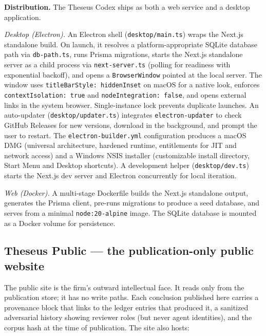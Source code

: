 \documentclass[11pt,letterpaper]{article}
\newcommand{\file}[1]{\texttt{#1}}
\begin{document}
\textbf{Distribution.} The Theseus Codex ships as both a web service and a desktop application.

\emph{Desktop (Electron).} An Electron shell (\file{desktop/main.ts}) wraps the Next.js standalone build. On launch, it resolves a platform-appropriate SQLite database path via \file{db-path.ts}, runs Prisma migrations, starts the Next.js standalone server as a child process via \file{next-server.ts} (polling for readiness with exponential backoff), and opens a \texttt{BrowserWindow} pointed at the local server. The window uses \texttt{titleBarStyle: hiddenInset} on macOS for a native look, enforces \texttt{contextIsolation: true} and \texttt{nodeIntegration: false}, and opens external links in the system browser. Single-instance lock prevents duplicate launches. An auto-updater (\file{desktop/updater.ts}) integrates \texttt{electron-updater} to check GitHub Releases for new versions, download in the background, and prompt the user to restart. The \file{electron-builder.yml} configuration produces a macOS DMG (universal architecture, hardened runtime, entitlements for JIT and network access) and a Windows NSIS installer (customizable install directory, Start Menu and Desktop shortcuts). A development helper (\file{desktop/dev.ts}) starts the Next.js dev server and Electron concurrently for local iteration.

\emph{Web (Docker).} A multi-stage Dockerfile builds the Next.js standalone output, generates the Prisma client, pre-runs migrations to produce a seed database, and serves from a minimal \texttt{node:20-alpine} image. The SQLite database is mounted as a Docker volume for persistence.

\subsection{Theseus Public --- the publication-only public website}

The public site is the firm's outward intellectual face. It reads only from the publication store; it has no write paths. Each conclusion published here carries a provenance block that links to the ledger entries that produced it, a sanitized adversarial history showing reviewer roles (but never agent identities), and the corpus hash at the time of publication. The site also hosts:
\end{document}

